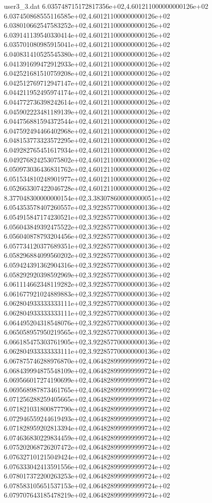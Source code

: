 \begin{filecontents}{user3_3.dat}
6.035748715172817356e+02,4.601211000000000126e+02
6.037450868555116585e+02,4.601211000000000126e+02
6.038010662547583252e+02,4.601211000000000126e+02
6.039141139540330414e+02,4.601211000000000126e+02
6.035701080985915041e+02,4.601211000000000126e+02
6.040831410525545380e+02,4.601211000000000126e+02
6.041391699472912933e+02,4.601211000000000126e+02
6.042521681510759208e+02,4.601211000000000126e+02
6.042512769712947147e+02,4.601211000000000126e+02
6.044211952495974174e+02,4.601211000000000126e+02
6.044772736398242614e+02,4.601211000000000126e+02
6.045902223481189139e+02,4.601211000000000126e+02
6.044756881594372544e+02,4.601211000000000126e+02
6.047592494466402968e+02,4.601211000000000126e+02
6.048153773323572295e+02,4.601211000000000126e+02
6.049282765451617934e+02,4.601211000000000126e+02
6.049276824253075802e+02,4.601211000000000126e+02
6.050973036436831762e+02,4.601211000000000126e+02
6.051534810248901977e+02,4.601211000000000126e+02
6.052663307422046728e+02,4.601211000000000126e+02
8.377048300000000154e+02,3.383078600000000051e+02
6.054353578407260557e+02,3.922857700000000136e+02
6.054915847174230521e+02,3.922857700000000136e+02
6.056043849392475522e+02,3.922857700000000136e+02
6.056040878793204456e+02,3.922857700000000136e+02
6.057734120377689351e+02,3.922857700000000136e+02
6.058296884099560202e+02,3.922857700000000136e+02
6.059424391362904316e+02,3.922857700000000136e+02
6.058292920398592969e+02,3.922857700000000136e+02
6.061114662348119282e+02,3.922857700000000136e+02
6.061677921024889883e+02,3.922857700000000136e+02
6.062804933333333111e+02,3.922857700000000136e+02
6.062804933333333111e+02,3.922857700000000136e+02
6.064495204318548076e+02,3.922857700000000136e+02
6.065058957950219565e+02,3.922857700000000136e+02
6.066185475303761905e+02,3.922857700000000136e+02
6.062804933333333111e+02,3.922857700000000136e+02
6.067875746288976870e+02,4.064828999999999724e+02
6.068439994875548109e+02,4.064828999999999724e+02
6.069566017274190699e+02,4.064828999999999724e+02
6.069568987873461765e+02,4.064828999999999724e+02
6.071256288259405665e+02,4.064828999999999724e+02
6.071821031800877790e+02,4.064828999999999724e+02
6.072946559244619493e+02,4.064828999999999724e+02
6.071828959202813394e+02,4.064828999999999724e+02
6.074636830229834459e+02,4.064828999999999724e+02
6.075202068726207472e+02,4.064828999999999724e+02
6.076327101215049424e+02,4.064828999999999724e+02
6.076333042413591556e+02,4.064828999999999724e+02
6.078017372200263253e+02,4.064828999999999724e+02
6.078583105651537153e+02,4.064828999999999724e+02
6.079707643185478219e+02,4.064828999999999724e+02

\end{filecontents}
